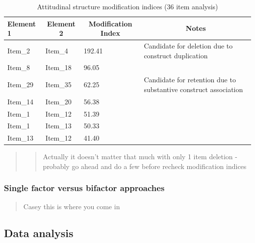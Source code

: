 \documentclass[
  english,
  man]{apa6}
\begin{document}
\begin{table}[tbp]

\begin{center}
\begin{threeparttable}

\caption{\label{tab:modindices}Attitudinal structure modification indices (36 item analysis)}

\begin{tabular}{m{2cm}m{2cm}m{2cm}m{7cm}}
\toprule
Element 1 & \multicolumn{1}{c}{Element 2} & \multicolumn{1}{c}{Modification Index} & \multicolumn{1}{c}{Notes}\\
\midrule
Item\_2 & Item\_4 & 192.41 & Candidate for deletion due to construct duplication\\
Item\_8 & Item\_18 & 96.05 & \\
Item\_29 & Item\_35 & 62.25 & Candidate for retention due to substantive construct association\\
Item\_14 & Item\_20 & 56.38 & \\
Item\_1 & Item\_12 & 51.39 & \\
Item\_1 & Item\_13 & 50.33 & \\
Item\_13 & Item\_12 & 41.40 & \\
\bottomrule
\end{tabular}

\end{threeparttable}
\end{center}

\end{table}

\begin{quote}
\begin{quote}
Actually it doesn't matter that much with only 1 item deletion - probably go ahead and do a few before recheck modification indices
\end{quote}
\end{quote}

\hypertarget{single-factor-versus-bifactor-approaches}{%
\subsubsection{Single factor versus bifactor approaches}\label{single-factor-versus-bifactor-approaches}}

\begin{quote}
Casey this is where you come in
\end{quote}

\hypertarget{data-analysis}{%
\subsection{Data analysis}\label{data-analysis}}
\end{document}
